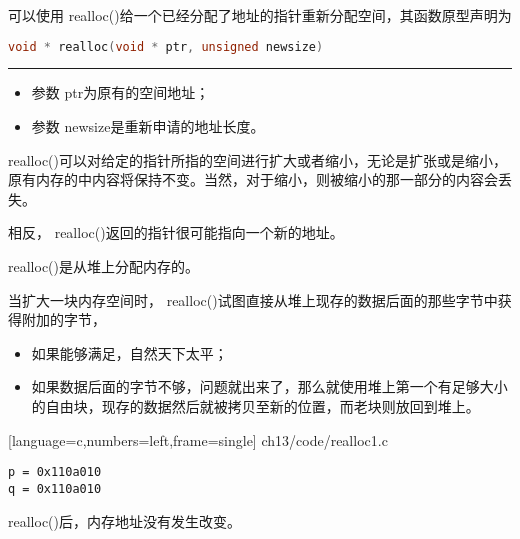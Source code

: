 \begin{frame}[fragile]
可以使用{ realloc()}给一个已经分配了地址的指针重新分配空间，其函数原型声明为
  \begin{lstlisting}[language=c,backgroundcolor=\color{red!20}]
void * realloc(void * ptr, unsigned newsize)    
  \end{lstlisting}
  \rule{\textwidth}{0.3mm} \pause \vspace{0.3mm}
  
  \begin{itemize}
  \item 参数{ ptr}为原有的空间地址；
  \item 参数{ newsize}是重新申请的地址长度。
  \end{itemize}
\end{frame}

\begin{frame}[fragile]
  { realloc()}可以对给定的指针所指的空间进行扩大或者缩小，无论是扩张或是缩小，原有内存的中内容将保持不变。当然，对于缩小，则被缩小的那一部分的内容会丢失。

  相反，{ realloc()}返回的指针很可能指向一个新的地址。
\end{frame}

\begin{frame}[fragile]
  { realloc()}是从堆上分配内存的。

  当扩大一块内存空间时，{ realloc()}试图直接从堆上现存的数据后面的那些字节中获得附加的字节，
  \begin{itemize}
  \item  如果能够满足，自然天下太平；
  \item  如果数据后面的字节不够，问题就出来了，那么就使用堆上第一个有足够大小的自由块，现存的数据然后就被拷贝至新的位置，而老块则放回到堆上。
  \end{itemize}
\end{frame}

\begin{frame}[fragile]
  
  [language=c,numbers=left,frame=single]
  {ch13/code/realloc1.c}
\end{frame}

\begin{frame}[fragile]
  \begin{lstlisting}[backgroundcolor=\color{red!20}] 
p = 0x110a010
q = 0x110a010
\end{lstlisting}
{ realloc()}后，内存地址没有发生改变。
\end{frame}

